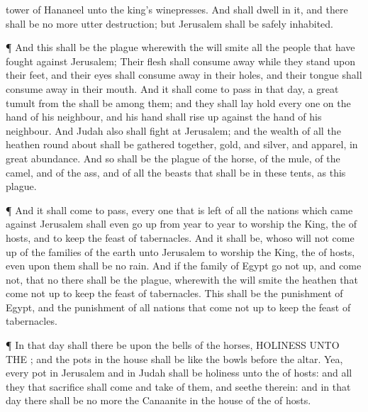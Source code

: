 {tower of
Hananeel unto the
king’s
winepresses.
And
{} shall
dwell in it, and there shall be no more utter
destruction; but
Jerusalem shall be
safely
inhabited.
\par }{\PP {}¶ And this shall be the
plague wherewith the
{} will
smite all the
people that have
fought against
Jerusalem; Their
flesh shall consume
away while they
stand upon their
feet, and their
eyes shall consume
away in their
holes, and their
tongue shall consume
away in their
mouth.
And it shall come to pass in that
day,
{} a
great
tumult from the
{} shall be among them; and they shall lay
hold every
one on the
hand of his
neighbour, and his
hand shall rise
up against the
hand of his
neighbour.
And
Judah also shall
fight at
Jerusalem; and the
wealth of all the
heathen round
about shall be gathered
together,
gold, and
silver, and
apparel, in
great
abundance.
And so shall be the
plague of the
horse, of the
mule, of the
camel, and of the
ass, and of all the
beasts that shall be in
these
tents, as this
plague.
\par }{\PP {}¶ And it shall come to pass,
{} every one that is
left of all the
nations which
came against
Jerusalem shall even go
up
from
year to
year to
worship the
King, the
{} of
hosts, and to
keep the
feast of
tabernacles.
And it shall be,
{} whoso will not come
up of
{} the
families of the
earth unto
Jerusalem to
worship the
King, the
{} of
hosts, even upon them shall be no
rain.
And if the
family of
Egypt go not
up, and
come not, that
{} no
{} there shall be the
plague, wherewith the
{} will
smite the
heathen that come not
up to
keep the
feast of
tabernacles.
This shall be the
punishment of
Egypt, and the
punishment of all
nations that come not
up to
keep the
feast of
tabernacles.
\par }{\PP {}¶ In that
day shall there be upon the
bells of the
horses,
HOLINESS UNTO THE
{}; and the
pots in the
{}
house shall be like the
bowls
before the
altar.
Yea, every
pot in
Jerusalem and in
Judah shall be
holiness unto the
{} of
hosts: and all they that
sacrifice shall
come and
take of them, and
seethe therein: and in that
day there shall be no more the
Canaanite in the
house of the
{} of
hosts.
\par }